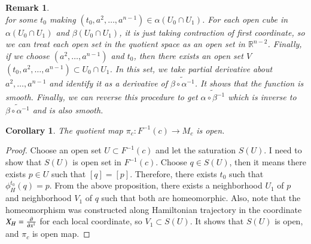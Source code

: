 \documentclass[a4paper, 12pt]{article}
\theoremstyle{Mydefinition}
\newtheorem{remark}[statement]{Remark}
\theoremstyle{Mytheorem}
\newtheorem{corollary}[statement]{Corollary}
\begin{document}
\begin{enumerate}
\begin{remark}
\begin{equation*}
    \end{equation*}
    for some $t_0$ making $(t_0, a^2, \ldots, a^{n-1})\in \alpha(U_0\cap U_1)$. For each open cube in $\alpha(U_0\cap U_1)$ and $\beta(U_0\cap U_1)$, it is just taking contraction of first coordinate, so we can treat each open set in the quotient space as an open set in $\mathbb{R}^{n-2}$. Finally, if we choose $(a^2, \ldots, a^{n-1})$ and $t_0$, then there exists an open set $V$ $(t_0, a^2, \ldots, a^{n-1})\subset U_0\cap U_1$. In this set, we take partial derivative about $a^2, \ldots, a^{n-1}$ and identify it as a derivative of $\widetilde{\beta\circ \alpha^{-1}}$. It shows that the function is smooth. Finally, we can reverse this procedure to get $\widetilde{\alpha\circ \beta^{-1}}$ which is inverse to $\widetilde{\beta\circ \alpha^{-1}}$ and is also smooth.
    \end{remark}
    
    \begin{corollary}
    The quotient map $\pi_c:F^{-1}(c)\rightarrow M_c$ is open.
    \end{corollary}
    \begin{proof}
    Choose an open set $U\subset F^{-1}(c)$ and let the saturation $S(U)$. I need to show that $S(U)$ is open set in $F^{-1}(c)$. Choose $q\in S(U)$, then it means there exists $p\in U$ such that $[q]=[p]$. Therefore, there exists $t_0$ such that $\phi^{t_0}_H(q) = p$. From the above proposition, there exists a neighborhood $U_1$ of $p$ and neighborhood $V_1$ of $q$ such that both are homeomorphic. Also, note that the homeomorphism was constructed along Hamiltonian trajectory in the coordinate $X_H = \pdv{x^1}$ for each local coordinate, so $V_1\subset S(U)$. It shows that $S(U)$ is open, and $\pi_c$ is open map.
    \end{proof}



\end{enumerate}
\end{document}
